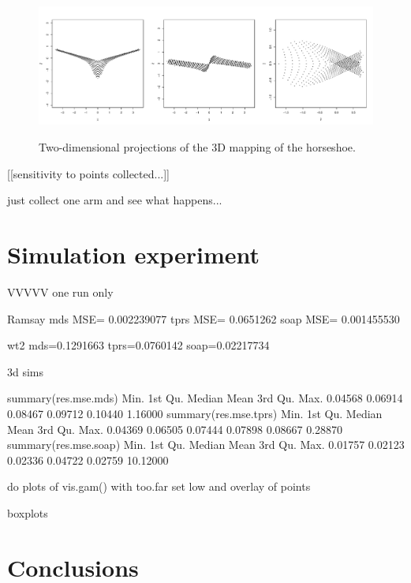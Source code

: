 \documentclass[a4paper,10pt]{amsart}
\begin{document}
\begin{figure}
\centering
\includegraphics[trim=0in 0.5in 0in 0.25in, width=5.5in]{figs/ramsay-mds-3d.pdf} \\
\caption{Two-dimensional projections of the 3D mapping of the horseshoe.}
\label{ramsay-mds-3d}
\end{figure}





[[sensitivity to points collected...]]

just collect one arm and see what happens...







\section{Simulation experiment}


VVVVV one run only

Ramsay
mds MSE= 0.002239077 
tprs MSE= 0.0651262 
soap MSE= 0.001455530 


wt2
mds=0.1291663
tprs=0.0760142
soap=0.02217734


3d sims

 summary(res.mse.mds)
   Min. 1st Qu.  Median    Mean 3rd Qu.    Max. 
0.04568 0.06914 0.08467 0.09712 0.10440 1.16000 
 summary(res.mse.tprs)
   Min. 1st Qu.  Median    Mean 3rd Qu.    Max. 
0.04369 0.06505 0.07444 0.07898 0.08667 0.28870 
 summary(res.mse.soap)
    Min.  1st Qu.   Median     Mean  3rd Qu.     Max. 
 0.01757  0.02123  0.02336  0.04722  0.02759 10.12000 





do plots of vis.gam() with too.far set low and overlay of points

boxplots



\section{Conclusions}




\end{document}
